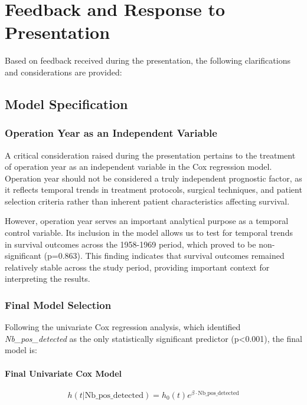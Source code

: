 \documentclass[12pt,a4paper]{article}
\begin{document}
\section{Feedback and Response to Presentation}

Based on feedback received during the presentation, the following clarifications and considerations are provided:

\subsection{Model Specification}

\subsubsection{Operation Year as an Independent Variable}

A critical consideration raised during the presentation pertains to the treatment of operation year as an independent variable in the Cox regression model. Operation year should not be considered a truly independent prognostic factor, as it reflects temporal trends in treatment protocols, surgical techniques, and patient selection criteria rather than inherent patient characteristics affecting survival.

However, operation year serves an important analytical purpose as a temporal control variable. Its inclusion in the model allows us to test for temporal trends in survival outcomes across the 1958-1969 period, which proved to be non-significant (p=0.863). This finding indicates that survival outcomes remained relatively stable across the study period, providing important context for interpreting the results.

\subsubsection{Final Model Selection}

Following the univariate Cox regression analysis, which identified \textit{Nb\_pos\_detected} as the only statistically significant predictor (p<0.001), the final model is:

\paragraph{Final Univariate Cox Model}

\begin{equation}
h(t|\text{Nb\_pos\_detected}) = h_0(t) e^{\beta \cdot \text{Nb\_pos\_detected}}
\label{eq:final_model}
\end{equation}
\end{document}
